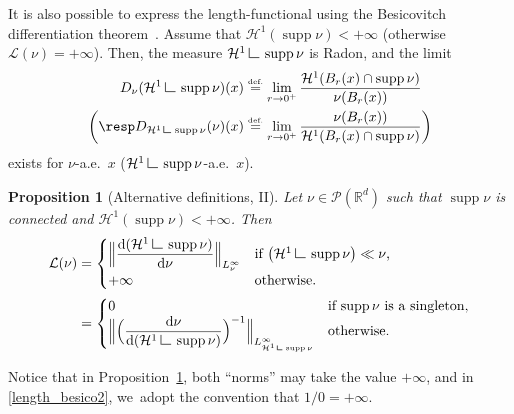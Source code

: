 \documentclass[10pt]{amsart}
\newtheorem{proposition}[theorem]{Proposition}
\theoremstyle{definition}
\newcommand{\eqdef}{\ensuremath{\stackrel{\mbox{\upshape\tiny def.}}{=}}}
\newcommand{\Bnorm}[1]{\Bigl\lVert#1\Bigr\rVert}
\newcommand\LM[1]{\hbox{\vrule width.5pt \vbox to#1pt{\vfill \hrule width#1pt height.5pt}}}
\newcommand\LL{{\mathchoice {\>\LM7\>}{\>\LM7\>}{\,\LM5\,}{\,\LM{3.35}\,}}}
\newcommand{\mres}{\LL}
\newcommand\cH{\mathcal{H}}
\newcommand{\RR}{\mathbb{R}}
\DeclareMathOperator{\supp}{supp}
\newcommand\dd{\mathrm{d}}
\begin{document}
It is also possible to express the length-functional using the Besicovitch differentiation theorem~\cite[Th.\,2.22]{ambrosio2000functions}. Assume that $\cH^1(\supp \nu)<+\infty$ (otherwise $\mathcal{L}(\nu)=+\infty$). Then, the measure $\cH^1\mres \supp\nu$ is Radon, and the limit
\begin{align}
D_\nu(\cH^1\mres \supp\nu)(x)&\eqdef \lim_{r \to 0^+} \frac{\cH^1(B_r(x)\cap \supp \nu)}{\nu(B_r(x))} \\ \bigg(\mbox{\resp} D_{\cH^1\mres \supp\nu}(\nu)(x)&\eqdef \lim_{r \to 0^+}\frac{\nu(B_r(x))}{\cH^1(B_r(x)\cap \supp \nu)}\bigg)
\end{align}
exists for $\nu$-a.e.\ $x$ (\resp $\cH^1\mres \supp\nu$-a.e.\ $x$).
\begin{proposition}[Alternative definitions, II]\label{prop.length.besico}
Let $\nu \in \mathcal{P}(\RR^d)$ such that $\supp \nu$ is connected and $\cH^1(\supp \nu)<+\infty$. Then
\begin{align}
\mathcal{L}(\nu) &=
\begin{cases}
\Bnorm{\dfrac{\dd(\cH^1\mres \supp\nu)}{\dd \nu}}_{L^{\infty}_\nu} & \mbox{if $\left(\cH^1\mres \supp \nu\right) \ll \nu$,}\\
+\infty &\mbox{otherwise.}
\end{cases}\label{length_besico1}\\
&=
\begin{cases}
0 & \mbox{if $\supp \nu$ is a singleton,}\\
\Bnorm{\Bigl(\dfrac{\dd \nu}{\dd(\cH^1\mres \supp\nu)}\Bigr)^{-1}}_{L^{\infty}_{\cH^1\mres \supp\nu}} & \mbox{otherwise}.
\end{cases}\label{length_besico2}
\end{align}
\end{proposition}
Notice that in Proposition~\ref{prop.length.besico}, both ``norms'' may take the value $+\infty$, and in \eqref{length_besico2}, we~adopt the convention that $1/0=+\infty$.
\end{document}
